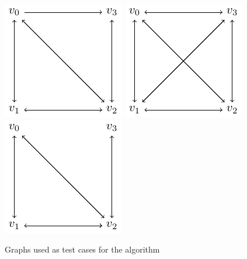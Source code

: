 \documentclass[10pt,a4paper]{article}
\begin{document}
\begin{figure}[hbtp]
\centering
\includegraphics[scale=1]{results/example_1_graph.pdf}
\includegraphics[scale=1]{results/example_2_graph.pdf}
\includegraphics[scale=1]{results/example_3_graph.pdf}
\caption{Graphs used as test cases for the algorithm}
\end{figure}
\end{document}
